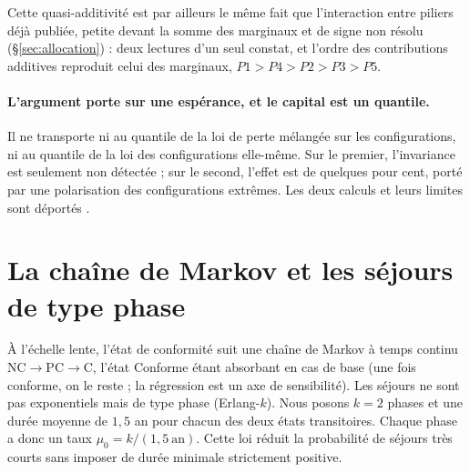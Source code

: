 Cette quasi-additivité est par ailleurs le même fait que l'interaction entre piliers déjà
publiée, petite devant la somme des marginaux et de signe non résolu (\S\ref{sec:allocation}) :
deux lectures d'un seul constat, et l'ordre des contributions additives reproduit celui des
marginaux, $P1 > P4 > P2 > P3 > P5$.

\paragraph{L'argument porte sur une espérance, et le capital est un quantile.} Il ne
transporte ni au quantile de la loi de perte mélangée sur les configurations, ni au quantile de
la loi des configurations elle-même. Sur le premier, l'invariance est seulement non détectée ;
sur le second, l'effet est de quelques pour cent, porté par une polarisation des configurations
extrêmes. Les deux calculs et leurs limites sont déportés \matcomp.

\section{La chaîne de Markov et les séjours de type phase}

À l'échelle lente, l'état de conformité suit une chaîne de Markov à temps continu
$\text{NC}\to\text{PC}\to\text{C}$, l'état Conforme étant absorbant en cas de base
(une fois conforme, on le reste ; la régression est un axe de sensibilité). Les séjours ne sont
pas exponentiels mais de type phase (Erlang-$k$). Nous posons $k=2$ phases et une durée
moyenne de $1{,}5$ an pour chacun des deux états transitoires. Chaque phase a donc un taux
$\mu_0=k/(1{,}5\ \text{an})$. Cette loi réduit la probabilité de séjours très courts sans imposer
de durée minimale strictement positive.

